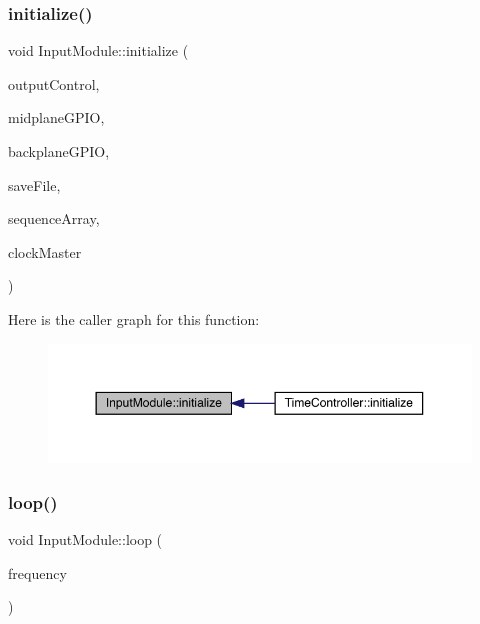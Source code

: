 \subsubsection{\texorpdfstring{initialize()}{initialize()}}
{\footnotesize\ttfamily void Input\+Module\+::initialize (\begin{DoxyParamCaption}\item[{\hyperlink{class_output_controller}{Output\+Controller} $\ast$}]{output\+Control,  }\item[{Zetaohm\+\_\+\+M\+A\+X7301 $\ast$}]{midplane\+G\+P\+IO,  }\item[{Zetaohm\+\_\+\+M\+A\+X7301 $\ast$}]{backplane\+G\+P\+IO,  }\item[{Flash\+Memory $\ast$}]{save\+File,  }\item[{Sequencer $\ast$}]{sequence\+Array,  }\item[{\hyperlink{class_master_clock}{Master\+Clock} $\ast$}]{clock\+Master }\end{DoxyParamCaption})}

Here is the caller graph for this function\+:
\nopagebreak
\begin{figure}[H]
\begin{center}
\leavevmode
\includegraphics[width=350pt]{class_input_module_a789c6f0da21e6b5b89c7c6991f4ee745_icgraph}
\end{center}
\end{figure}
\mbox{\label{class_input_module_ad481ab7241ffe3a168e063a5afd6d892}} 
\subsubsection{\texorpdfstring{loop()}{loop()}}
{\footnotesize\ttfamily void Input\+Module\+::loop (\begin{DoxyParamCaption}\item[{uint16\+\_\+t}]{frequency }\end{DoxyParamCaption})}


